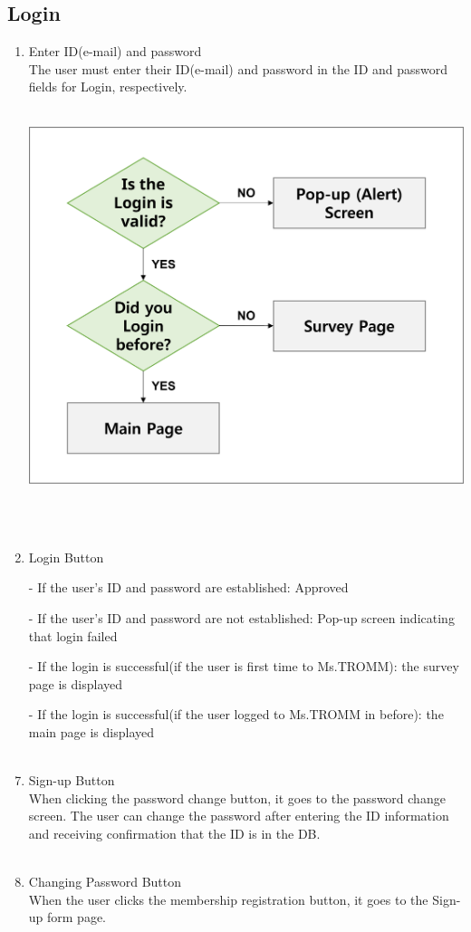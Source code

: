 \documentclass[conference]{IEEEtran}
\begin{document}
\subsection{Login}
\begin{enumerate}
    \item Enter ID(e-mail) and password\\
        The user must enter their ID(e-mail) and password in the ID and password fields for Login, respectively. \\ \\
    \centerline{\includegraphics[scale=0.5]{assets/flow_2.png}} \\ \\
    \item Login Button\\
        \item[-] If the user’s ID and password are established: Approved\\
        \item[-] If the user’s ID and password are not established: Pop-up screen indicating that login failed\\
        \item[-] If the login is successful(if the user is first time to Ms.TROMM): the survey page is displayed\\
        \item[-] If the login is successful(if the user logged to Ms.TROMM in before): the main page is displayed\\ \\
    \item Sign-up Button\\
        When clicking the password change button, it goes to the password change screen. The user can change the password after entering the ID information and receiving confirmation that the ID is in the DB.\\ \\
    \item Changing Password Button\\
        When the user clicks the membership registration button, it goes to the Sign-up form page. 
\end{enumerate}
\end{document}

